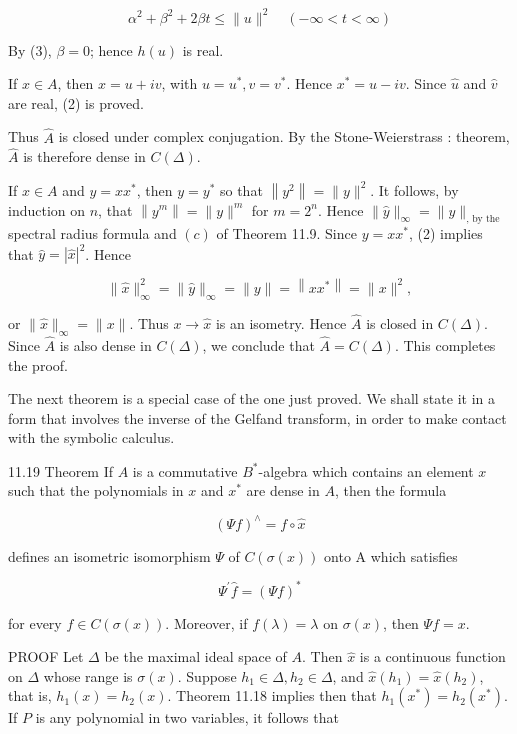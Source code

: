 \documentclass[10pt]{article}
\begin{document}
$$
\alpha^{2}+\beta^{2}+2 \beta t \leq\|u\|^{2} \quad(-\infty<t<\infty)
$$

By (3), $\beta=0$; hence $h(u)$ is real.

If $x \in A$, then $x=u+i v$, with $u=u^{*}, v=v^{*}$. Hence $x^{*}=u-i v$. Since $\hat{u}$ and $\hat{v}$ are real, (2) is proved.

Thus $\hat{A}$ is closed under complex conjugation. By the Stone-Weierstrass : theorem, $\hat{A}$ is therefore dense in $C(\Delta)$.

If $x \in A$ and $y=x x^{*}$, then $y=y^{*}$ so that $\left\|y^{2}\right\|=\|y\|^{2}$. It follows, by induction on $n$, that $\left\|y^{m}\right\|=\|y\|^{m}$ for $m=2^{n}$. Hence $\|\hat{y}\|_{\infty}=\|y\|_{\text {, by the }}$ spectral radius formula and $(c)$ of Theorem 11.9. Since $y=x x^{*}$, (2) implies that $\hat{y}=|\hat{x}|^{2}$. Hence

$$
\|\hat{x}\|_{\infty}^{2}=\|\hat{y}\|_{\infty}=\|y\|=\left\|x x^{*}\right\|=\|x\|^{2},
$$

or $\|\hat{x}\|_{\infty}=\|x\|$. Thus $x \rightarrow \hat{x}$ is an isometry. Hence $\hat{A}$ is closed in $C(\Delta)$. Since $\hat{A}$ is also dense in $C(\Delta)$, we conclude that $\hat{A}=C(\Delta)$. This completes the proof.

The next theorem is a special case of the one just proved. We shall state it in a form that involves the inverse of the Gelfand transform, in order to make contact with the symbolic calculus.

11.19 Theorem If $A$ is a commutative $B^{*}$-algebra which contains an element $x$ such that the polynomials in $x$ and $x^{*}$ are dense in $A$, then the formula

$$
(\Psi f)^{\wedge}=f \circ \hat{x}
$$

defines an isometric isomorphism $\Psi$ of $C(\sigma(x))$ onto A which satisfies

$$
\Psi^{\prime} \hat{f}=(\Psi f)^{*}
$$

for every $f \in C(\sigma(x))$. Moreover, if $f(\lambda)=\lambda$ on $\sigma(x)$, then $\Psi f=x$.

PROOF Let $\Delta$ be the maximal ideal space of $A$. Then $\hat{x}$ is a continuous function on $\Delta$ whose range is $\sigma(x)$. Suppose $h_{1} \in \Delta, h_{2} \in \Delta$, and $\hat{x}\left(h_{1}\right)=\hat{x}\left(h_{2}\right)$, that is, $h_{1}(x)=h_{2}(x)$. Theorem 11.18 implies then that $h_{1}\left(x^{*}\right)=h_{2}\left(x^{*}\right)$. If $P$ is any polynomial in two variables, it follows that
\end{document}
